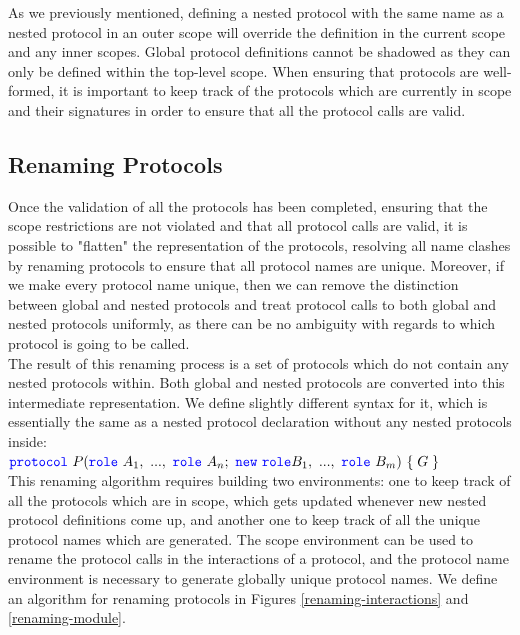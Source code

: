 \documentclass[12pt,twoside]{report}
\begin{document}
As we previously mentioned, defining a nested protocol with the same name as a nested protocol in an outer scope will override the definition in the current scope and any inner scopes. Global protocol definitions cannot be shadowed as they can only be defined within the top-level scope. When ensuring that protocols are well-formed, it is important to keep track of the protocols which are currently in scope and their signatures in order to ensure that all the protocol calls are valid. 

\subsection{Renaming Protocols}

Once the validation of all the protocols has been completed, ensuring that the scope restrictions are not violated and that all protocol calls are valid, it is possible to "flatten" the representation of the protocols, resolving all name clashes by renaming protocols to ensure that all protocol names are unique. Moreover, if we make every protocol name unique, then we can remove the distinction between global and nested protocols and treat protocol calls to both global and nested protocols uniformly, as there can be no ambiguity with regards to which protocol is going to be called.\\

The result of this renaming process is a set of protocols which do not contain any nested protocols within. Both global and nested protocols are converted into this intermediate representation. We define slightly different syntax for it, which is essentially the same as a nested protocol declaration without any nested protocols inside:\\

$\protocol\ P(\role\ A_1,\ ...,\ \role\ A_n;\ \scrnew\ \role B_1,\ ...,\ \role\ B_m)\ \{\;G\;\}$\\

This renaming algorithm requires building two environments: one to keep track of all the protocols which are in scope, which gets updated whenever new nested protocol definitions come up, and another one to keep track of all the unique protocol names which are generated. The scope environment can be used to rename the protocol calls in the interactions of a protocol, and the protocol name environment is necessary to generate globally unique protocol names. We define an algorithm for renaming protocols in Figures \ref{renaming-interactions} and \ref{renaming-module}.\\
\end{document}
